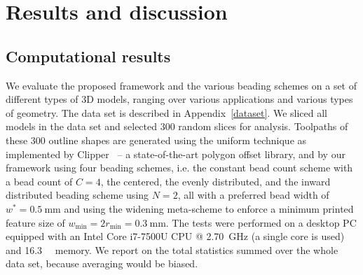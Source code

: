 \section{Results and discussion}






{
\subsection{Computational results}\label{sec_computational_results}
} %
We evaluate the proposed framework and the various beading schemes on a set of different types of 3D models, ranging over various applications and various types of geometry. 
The data set is described in Appendix~\ref{dataset}.
We sliced all models in the data set and selected 300 random slices for analysis.
Toolpaths of these 300 outline shapes are generated using the uniform technique as implemented by Clipper~\cite{johnson2014clipper} -- a state-of-the-art polygon offset library,
and by our framework using four beading schemes, i.e. the constant bead count scheme with a bead count of $C=4$, the centered, the evenly distributed, and the inward distributed beading scheme using {$N=2$}, all with a preferred bead width{} of {$w^* = \SI{0.5}{\milli\meter}$ and using the widening meta-scheme to enforce a minimum printed feature size of $w_\text{min}=2r_\text{min}=\SI{0.3}{\milli\meter}$}.
The tests were performed on a desktop PC equipped with an Intel Core i7-7500U CPU @ \SI{2.70}{\giga\hertz} (a single core is used) and \SI{16.3}{\giga\byte} memory.
{We report on the total statistics summed over the whole data set, because averaging would be biased.}






